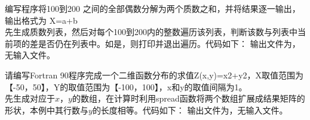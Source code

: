 \documentclass{ctexart}
\begin{document}
\maketitle

\begin{answer}

    编写程序将100到200 之间的全部偶数分解为两个质数之和，并将结果逐一输出，输出格式为 X=a+b\\

    先生成质数列表，然后对每个100到200内的整数遍历该列表，判断该数与列表中当前项的差是否仍在列表中。如是，则打印并退出遍历。代码如下：
    输出文件为，无输入文件。

    请编写Fortran 90程序完成一个二维函数分布的求值Z(x,y)=x2+y2，X取值范围为【-50，50】，Y的取值范围为【-100，100】，x和y的取值间隔为1。\\

    先生成对应于$x$，$y$的数组，在计算时利用spread函数将两个数组扩展成结果矩阵的形状，本例中其行数与$y$的长度相等。代码如下：
    输出文件为，无输入文件。

\end{answer}
\end{document}
